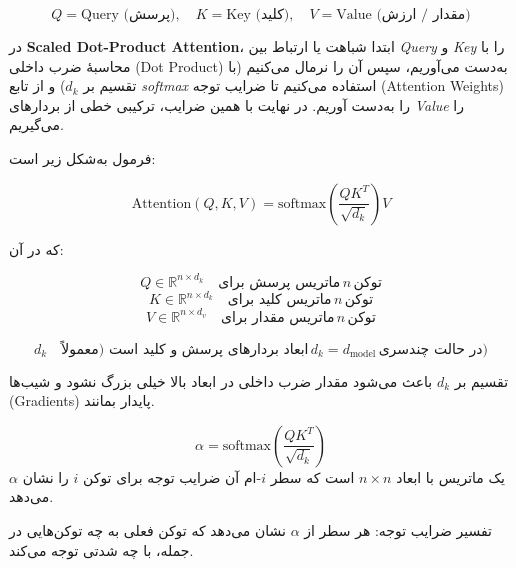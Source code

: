 \[
Q = \text{Query (پرسش)}, \quad K = \text{Key (کلید)}, \quad V = \text{Value (مقدار / ارزش)}
\]

در \textbf{Scaled Dot-Product Attention}، ابتدا شباهت یا ارتباط بین \textit{Query} و \textit{Key} را با محاسبهٔ ضرب داخلی (Dot Product) به‌دست می‌آوریم، سپس آن را نرمال می‌کنیم (با تقسیم بر \( d_k \)) و از تابع \textit{softmax} استفاده می‌کنیم تا ضرایب توجه (Attention Weights) را به‌دست آوریم. در نهایت با همین ضرایب، ترکیبی خطی از بردارهای \textit{Value} را می‌گیریم.

فرمول به‌شکل زیر است:

\[
\text{Attention}(Q, K, V) = \text{softmax}\left( \frac{QK^T}{\sqrt{d_k}} \right) V
\]

که در آن:

\[
Q \in \mathbb{R}^{n \times d_k} \quad \text{ماتریس پرسش برای} \, n \, \text{توکن}
\]
\[
K \in \mathbb{R}^{n \times d_k} \quad \text{ماتریس کلید برای} \, n \, \text{توکن}
\]
\[
V \in \mathbb{R}^{n \times d_v} \quad \text{ماتریس مقدار برای} \, n \, \text{توکن}
\]

\[
d_k \quad \text{ابعاد بردارهای پرسش و کلید است (معمولاً} \, d_k = d_{\text{model}} \, \text{در حالت چندسری)}
\]

تقسیم بر \( d_k \) باعث می‌شود مقدار ضرب داخلی در ابعاد بالا خیلی بزرگ نشود و شیب‌ها (Gradients) پایدار بمانند.

\[
\alpha = \text{softmax}\left( \frac{QK^T}{\sqrt{d_k}} \right)
\]
\(\alpha\) یک ماتریس با ابعاد \( n \times n \) است که سطر \( i \)-ام آن ضرایب توجه برای توکن \( i \) را نشان می‌دهد.

تفسیر ضرایب توجه: هر سطر از \( \alpha \) نشان می‌دهد که توکن فعلی به چه توکن‌هایی در جمله، با چه شدتی توجه می‌کند.



